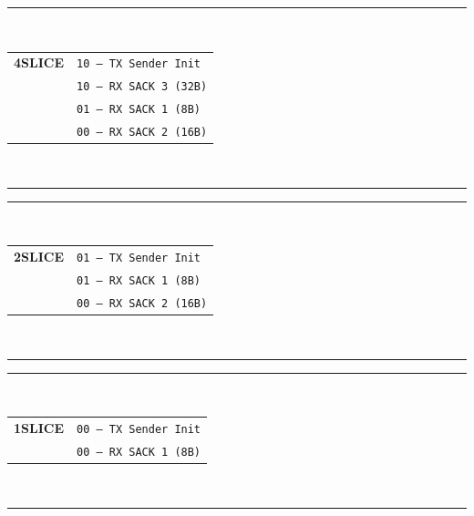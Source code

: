 \documentclass[../HFT-main.tex]{subfiles}
\begin{document}
\begin{margintable}
  \footnotesize
  \rule{5.4cm}{0.8pt}\\
  \begin{tabular}{@{}cl@{}}
    \textbf{4SLICE} & \texttt{10 — TX Sender Init} \\
                      & \texttt{10 — RX SACK 3 (32B)} \\
                   & \texttt{01 — RX SACK 1 (8B)} \\
                   & \texttt{00 — RX SACK 2 (16B)} \\
  \end{tabular}\\
  \rule{5.4cm}{0.6pt}
\end{margintable}

\begin{margintable}
  \footnotesize
  \rule{5.4cm}{0.8pt}\\
  \begin{tabular}{@{}cl@{}}
    \textbf{2SLICE} & \texttt{01 — TX Sender Init} \\
                   & \texttt{01 — RX SACK 1 (8B)} \\
                   & \texttt{00 — RX SACK 2 (16B)} \\
  \end{tabular}\\
  \rule{5.4cm}{0.6pt}
\end{margintable}

\begin{margintable}
  \footnotesize
  \rule{5.4cm}{0.8pt}\\
  \begin{tabular}{@{}cl@{}}
    \textbf{1SLICE} & \texttt{00 — TX Sender Init} \\
                   & \texttt{00 — RX SACK 1 (8B)} \\
  \end{tabular}\\
  \rule{5.4cm}{0.6pt}
\end{margintable}

\begin{margintable} %
  \footnotesize
  \begin{tabular}{@{}cl@{}}
  \end{tabular}\\
\end{margintable}
\end{document}
